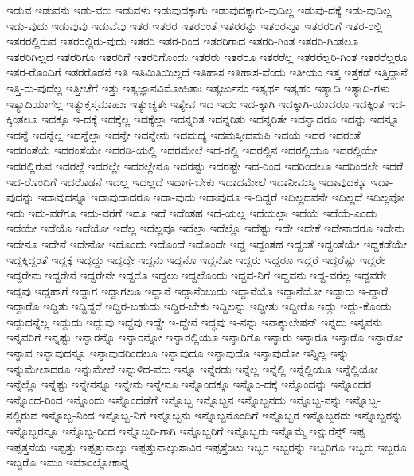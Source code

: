 {ಇಡುವ
ಇಡುವನು
ಇಡು-ವರು
ಇಡುವಳು
ಇಡುವುದಕ್ಕಾಗು
ಇಡುವುದಕ್ಕಾಗು-ವುದಿಲ್ಲ
ಇಡುವು-ದಕ್ಕೆ
ಇಡು-ವುದಿಲ್ಲ
ಇಡು-ವುದು
ಇಡುವುವು
ಇಡುವೆವು
ಇತರ
ಇತರರ
ಇತರರಂತೆ
ಇತರರನ್ನು
ಇತರರನ್ನೂ
ಇತರರರಿಗೆ
ಇತರ-ರಲ್ಲಿ
ಇತರರಲ್ಲಿರುವ
ಇತರರಲ್ಲಿರು-ವುದು
ಇತರರಿ
ಇತರ-ರಿಂದ
ಇತರರಿಗಾದ
ಇತರರಿ-ಗಿಂತ
ಇತರರಿ-ಗಿಂತಲೂ
ಇತರರಿಗಿಲ್ಲದ
ಇತರರಿಗೂ
ಇತರರಿಗೆ
ಇತರರಿಗೊಂದು
ಇತರರು
ಇತರರೂ
ಇತರರೆಲ್ಲ
ಇತರರೆಲ್ಲರಿ-ಗಿಂತ
ಇತರರೆಲ್ಲರೂ
ಇತರ-ರೊಂದಿಗೆ
ಇತರರೊಡನೆ
ಇತಿ
ಇತಿಮಿತಿಯಿಲ್ಲದೆ
ಇತಿಹಾಸ
ಇತಿಹಾಸ-ವೆಂದು
ಇತೀಯಂ
ಇತ್ತ
ಇತ್ತಕಡೆ
ಇತ್ತಿದ್ದಾನೆ
ಇತ್ತಿ-ರು-ವುದೆಲ್ಲ
ಇತ್ತೀಚೆಗೆ
ಇತ್ತು
ಇತ್ಯಜ್ಞಾನವಿಮೋಹಿತಾಃ
ಇತ್ಯರ್ಜುನಂ
ಇತ್ಯರ್ಥ
ಇತ್ಯಹಂ
ಇತ್ಯಾದಿ
ಇತ್ಯಾದಿ-ಗಳು
ಇತ್ಯಾದಿಯಾಗೆಲ್ಲ
ಇತ್ಯುಕ್ತಸ್ತಮಾಹುಃ
ಇತ್ಯುಚ್ಯತೇ
ಇತ್ಯೇವ
ಇದ
ಇದಂ
ಇದ-ಕ್ಕಾಗಿ
ಇದಕ್ಕಾಗಿ-ಯಾದರೂ
ಇದಕ್ಕಿಂತ
ಇದ-ಕ್ಕಿಂತಲೂ
ಇದಕ್ಕೂ
ಇ-ದಕ್ಕೆ
ಇದಕ್ಕೆಲ್ಲ
ಇದಕ್ಕೆಲ್ಲಾ
ಇದನ್ನರಿತ
ಇದನ್ನರಿತು
ಇದನ್ನರಿತೇ
ಇದನ್ನಾದರೂ
ಇದನ್ನು
ಇದನ್ನೂ
ಇದನ್ನೆ
ಇದನ್ನೆಲ್ಲ
ಇದನ್ನೆಲ್ಲಾ
ಇದನ್ನೇ
ಇದನ್ನೇನು
ಇದಮದ್ಯ
ಇದಮಸ್ತೀದಮಪಿ
ಇದಯೆ
ಇದರ
ಇದರಂತೆ
ಇದರಂತೆಯೆ
ಇದರಂತೆಯೇ
ಇದರಡಿ-ಯಲ್ಲಿ
ಇದರಮೇಲೆ
ಇದ-ರಲ್ಲಿ
ಇದರಲ್ಲಿನ
ಇದರಲ್ಲಿಯೂ
ಇದರಲ್ಲಿಯೇ
ಇದರಲ್ಲಿರುವ
ಇದರಲ್ಲೆ
ಇದರಲ್ಲೇ
ಇದರಲ್ಲೇನೂ
ಇದರಷ್ಟು
ಇದರಷ್ಟೇ
ಇದ-ರಿಂದ
ಇದರಿಂದಲೂ
ಇದರಿಂದಲೇ
ಇದರೆ
ಇದ-ರೊಂದಿಗೆ
ಇದರೊಡನೆ
ಇದಲ್ಲ
ಇದಲ್ಲದೆ
ಇದಾಗ-ಬೇಕು
ಇದಾದಮೇಲೆ
ಇದಾನೀಮಸ್ಮಿ
ಇದಾವುದಕ್ಕೂ
ಇದಾ-ವುದನ್ನು
ಇದಾವುದನ್ನೂ
ಇದಾವುದಾದರೂ
ಇದಾ-ವುದು
ಇದಾವುದೂ
ಇ-ದಿದ್ದರೆ
ಇದಿಲ್ಲದವನೇ
ಇದಿಲ್ಲದೆ
ಇದಿಲ್ಲವೋ
ಇದು
ಇದು-ವರೆಗೂ
ಇದು-ವರೆಗೆ
ಇದೂ
ಇದೆ
ಇದೆಂತಹ
ಇದೆ-ಯಲ್ಲ
ಇದೆಯಲ್ಲಾ
ಇದೆಯೆ
ಇದೆಯೆ-ಎಂದು
ಇದೆಯೇ
ಇದೆಯೊ
ಇದೆಯೋ
ಇದೆಲ್ಲ
ಇದೆಲ್ಲವೂ
ಇದೆಲ್ಲಾ
ಇದೆಲ್ಲೊ
ಇದೆಷ್ಟು
ಇದೇ
ಇದೇಕೆ
ಇದೇನಾದರೂ
ಇದೇನು
ಇದೇನೂ
ಇದೇನೆ
ಇದೇನೋ
ಇದೊಂದು
ಇದೊಂದೆ
ಇದೊಂದೇ
ಇದ್ದ
ಇದ್ದಂತಹ
ಇದ್ದಂತೆ
ಇದ್ದಂತೆಯೇ
ಇದ್ದಕಡೆಯೇ
ಇದ್ದಕ್ಕಿದ್ದಂತೆ
ಇದ್ದಕ್ಕೆ
ಇದ್ದದ್ದು
ಇದ್ದದ್ದೇ
ಇದ್ದನು
ಇದ್ದನೊ
ಇದ್ದನೋ
ಇದ್ದರು
ಇದ್ದರೂ
ಇದ್ದರೆ
ಇದ್ದರೆಷ್ಟು
ಇದ್ದರೇ
ಇದ್ದರೇನು
ಇದ್ದರೇನೆ
ಇದ್ದರೇನೇ
ಇದ್ದರೊ
ಇದ್ದಲು
ಇದ್ದಲೊಂದು
ಇದ್ದವ-ನಿಗೆ
ಇದ್ದವನು
ಇದ್ದ-ವರೆಲ್ಲ
ಇದ್ದವರೇ
ಇದ್ದವು
ಇದ್ದಹಾಗೆ
ಇದ್ದಾಗ
ಇದ್ದಾಗಲೂ
ಇದ್ದಾನೆ
ಇದ್ದಾನೆಂಬುದು
ಇದ್ದಾನೆಯೊ
ಇದ್ದಾನೆಯೋ
ಇದ್ದಾರು
ಇ-ದ್ದಾರೆ
ಇದ್ದಾರೊ
ಇದ್ದಿತು
ಇದ್ದಿದ್ದರೆ
ಇದ್ದಿರ-ಬಹುದು
ಇದ್ದಿರ-ಬೇಕು
ಇದ್ದಿಲನ್ನು
ಇದ್ದೀತು
ಇದ್ದೀರೊ
ಇದ್ದು
ಇದ್ದು-ಕೊಂಡು
ಇದ್ದುದನ್ನೆಲ್ಲ
ಇದ್ದುದು
ಇದ್ದುವು
ಇದ್ದೆವು
ಇದ್ದೇ
ಇ-ದ್ದೇನೆ
ಇದ್ಧವು
ಇ-ನನ್ನು
ಇನಾಕ್ಯುಲೇಷನ್
ಇನ್ನದು
ಇನ್ನವನು
ಇನ್ನವರಿಗೆ
ಇನ್ನಷ್ಟು
ಇನ್ನಾರನ್ನೊ
ಇನ್ನಾರನ್ನೋ
ಇನ್ನಾರಲ್ಲಿಯೂ
ಇನ್ನಾರಿಗೊ
ಇನ್ನಾರು
ಇನ್ನಾರೂ
ಇನ್ನಾರೊ
ಇನ್ನಾರೋ
ಇನ್ನಾವ
ಇನ್ನಾವುದನ್ನೂ
ಇನ್ನಾವುದರಿಂದಲೂ
ಇನ್ನಾವುದೂ
ಇನ್ನಾವುದೊ
ಇನ್ನಾವುದೋ
ಇನ್ನಿಲ್ಲ
ಇನ್ನು
ಇನ್ನುಮೇಲಾದರೂ
ಇನ್ನುಮೇಲೆ
ಇನ್ನುಳಿದ-ವರು
ಇನ್ನೂ
ಇನ್ನೆರಡು
ಇನ್ನೆಲ್ಲ
ಇನ್ನೆಲ್ಲಿ
ಇನ್ನೆಲ್ಲಿಯೂ
ಇನ್ನೆಲ್ಲಿಯೋ
ಇನ್ನೆಲ್ಲೊ
ಇನ್ನೆಷ್ಟು
ಇನ್ನೇನನ್ನೂ
ಇನ್ನೇನು
ಇನ್ನೇನೂ
ಇನ್ನೊಂದಕ್ಕೂ
ಇನ್ನೊಂ-ದಕ್ಕೆ
ಇನ್ನೊಂದನ್ನು
ಇನ್ನೊಂದರ
ಇನ್ನೊಂದ-ರಿಂದ
ಇನ್ನೊಂದು
ಇನ್ನೊಂದೆಡೆಗೆ
ಇನ್ನೊಬ್ಬ
ಇನ್ನೊಬ್ಬನ
ಇನ್ನೊಬ್ಬನದು
ಇನ್ನೊಬ್ಬ-ನನ್ನು
ಇನ್ನೊಬ್ಬ-ನಲ್ಲಿರುವ
ಇನ್ನೊಬ್ಬ-ನಿಂದ
ಇನ್ನೊಬ್ಬ-ನಿಗೆ
ಇನ್ನೊಬ್ಬನು
ಇನ್ನೊಬ್ಬನೊಂದಿಗೆ
ಇನ್ನೊಬ್ಬರ
ಇನ್ನೊಬ್ಬರದು
ಇನ್ನೊಬ್ಬರನ್ನು
ಇನ್ನೊಬ್ಬರನ್ನೂ
ಇನ್ನೊಬ್ಬ-ರಿಂದ
ಇನ್ನೊಬ್ಬರಿ-ಗಾಗಿ
ಇನ್ನೊಬ್ಬರಿಗೆ
ಇನ್ನೊಬ್ಬರು
ಇನ್ನೊಮ್ಮೆ
ಇನ್ಷುರೆನ್ಸ್
ಇಪ್ಪ
ಇಪ್ಪತ್ತನೆಯ
ಇಪ್ಪತ್ತು
ಇಪ್ಪತ್ತುನಾಲ್ಕು
ಇಪ್ಪತ್ತುನಾಲ್ಕುಸಾವಿರ
ಇಪ್ಪತ್ತೆಂಟು
ಇಬ್ಬರ
ಇಬ್ಬರನ್ನು
ಇಬ್ಬರಿಗೂ
ಇಬ್ಬರು
ಇಬ್ಬರೂ
ಇಬ್ಬರೊ
ಇಮಂ
ಇಮಾಂಲ್ಲೋಕಾನ್ನ
}
